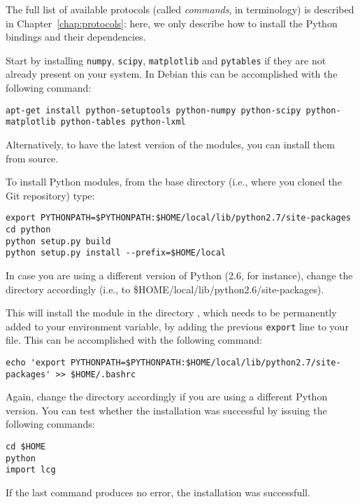The full list of available protocols (called \emph{commands}, in \progname terminology) is described in
Chapter~\ref{chap:protocols}: here, we only describe how to install
the Python bindings and their dependencies.

Start by installing  \texttt{numpy}, \texttt{scipy},
\texttt{matplotlib} and \texttt{pytables} if they are not already
present on your system. In Debian this can be accomplished with the
following command:
\begin{lstlisting}
apt-get install python-setuptools python-numpy python-scipy python-matplotlib python-tables python-lxml
\end{lstlisting}
Alternatively, to have the latest version of the modules, you can
install them from source.

To install \progname Python modules, from the base directory (i.e.,
where you cloned the Git repository) type:
\begin{lstlisting}
export PYTHONPATH=$PYTHONPATH:$HOME/local/lib/python2.7/site-packages
cd python
python setup.py build
python setup.py install --prefix=$HOME/local
\end{lstlisting}
In case you are using a different version of Python (2.6, for instance), change
the directory accordingly (i.e., to \$HOME/local/lib/python2.6/site-packages).

This will install the module in the directory
, which needs to
be permanently added to your  environment variable, by
adding the previous \verb+export+ line to your  file.
This can be accomplished with the following command:
\begin{lstlisting}
echo 'export PYTHONPATH=$PYTHONPATH:$HOME/local/lib/python2.7/site-packages' >> $HOME/.bashrc
\end{lstlisting}
Again, change the directory accordingly if you are using a different Python version.
You can test whether the installation was successful by
issuing the following commands:
\begin{lstlisting}
cd $HOME
python
import lcg
\end{lstlisting}
If the last command produces no error, the installation was successfull.

